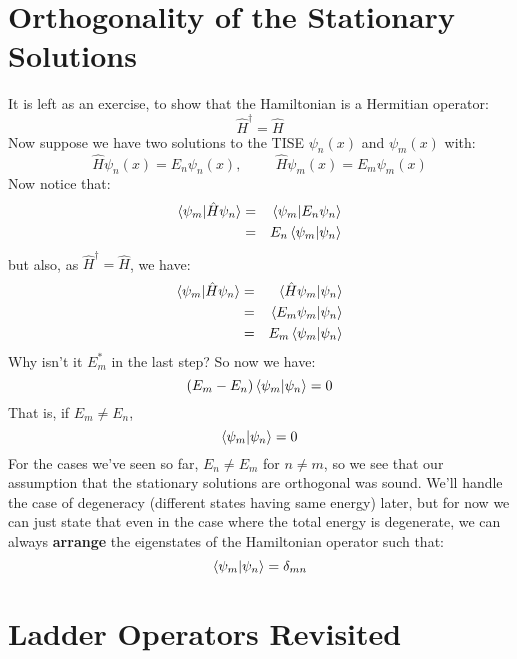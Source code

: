\documentclass[12pt]{book}
\begin{document}
\section{Orthogonality of the Stationary Solutions}
It is left as an exercise, to show that the Hamiltonian is a Hermitian operator:
$$\hat{H}^\dagger = \hat{H}$$
Now suppose we have two solutions to the TISE $\psi_n(x)$ and $\psi_m(x)$ with:
$$\hat{H}\psi_n(x) = E_n \psi_n(x), \hspace{1cm} \hat{H}\psi_m(x) = E_m \psi_m(x)$$
Now notice that:
\begin{eqnarray*}
\braket{\psi_m|\hat{H}\psi_n} &=& \braket{\psi_m|E_n\psi_n}\\
&=& E_n \braket{\psi_m|\psi_n}
\end{eqnarray*}
but also, as $\hat{H}^\dagger = \hat{H}$, we have:
\begin{eqnarray*}
\braket{\psi_m|\hat{H}\psi_n} &=& \braket{\hat{H}\psi_m|\psi_n}\\
&=& \braket{E_m\psi_m|\psi_n}\\
&=& E_m \braket{\psi_m|\psi_n}
\end{eqnarray*}
Why isn't it $E_m^*$ in the last step?  So now we have:
$$(E_m-E_n)\braket{\psi_m|\psi_n} = 0$$
That is, if $E_m \neq E_n$,
\begin{equation}
\braket{\psi_m|\psi_n} = 0
\end{equation}
For the cases we've seen so far, $E_n \neq E_m$ for $n \neq m$, so we see that our assumption that the stationary solutions are orthogonal was sound.  We'll handle the case of degeneracy (different states having same energy) later, but for now we can just state that even in the case where the total energy is degenerate, we can always {\bf arrange} the eigenstates of the Hamiltonian operator such that:
\begin{equation}
\braket{\psi_m|\psi_n} = \delta_{mn}
\end{equation}

\section{Ladder Operators Revisited}
\end{document}
